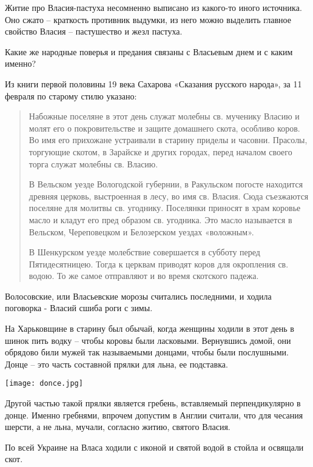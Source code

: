 \documentclass[a5paper,11pt,openany]{article}
\begin{document}
   Житие про Власия-пастуха несомненно выписано из какого-то иного источника. Оно сжато – краткость противник выдумки, из него можно выделить главное свойство Власия – пастушество и жезл пастуха.

  Какие же народные поверья и предания связаны с Власьевым днем и с каким именно?

   Из книги первой половины 19 века Сахарова «Сказания русского народа», за 11 февраля по старому стилю указано:



\begin{quotation}
\noindent Набожные поселяне в этот день служат молебны св. мученику Власию и молят его о покровительстве и защите домашнего скота, особливо коров. Во имя его прихожане устраивали в старину приделы и часовни. Прасолы, торгующие скотом, в Зарайске и других городах, перед началом своего торга служат молебны св. Власию. 

В Вельском уезде Вологодской губернии, в Ракульском погосте находится древняя церковь, выстроенная в лесу, во имя св. Власия. Сюда съезжаются поселяне для молитвы св. угоднику. Поселянки приносят в храм коровье масло и кладут его пред образом св. угодника. Это масло называется в Вельском, Череповецком и Белозерском уездах «воложным». 

В Шенкурском уезде молебствие совершается в субботу перед Пятидесятницею. Тогда к церквам приводят коров для окропления св. водою. То же самое отправляют и во время скотского падежа.
\end{quotation}

   Волосовские, или Власьевские морозы считались последними, и ходила поговорка - Власий сшиба роги с зимы.

   На Харьковщине в старину был обычай, когда женщины ходили в этот день в шинок пить водку – чтобы коровы были ласковыми. Вернувшись домой, они обрядово били мужей так называемыми донцами, чтобы были послушными. Донце – это часть составной прялки для льна, ее подставка.

\begin{center}
\texttt{[image: donce.jpg]}
\end{center}

  Другой частью такой прялки является гребень, вставляемый перпендикулярно в донце. Именно гребнями, впрочем допустим в Англии считали, что для чесания шерсти, а не льна, мучали, согласно житию, святого Власия.

   По всей Украине на Власа ходили с иконой и святой водой в стойла и освящали скот.
\end{document}
